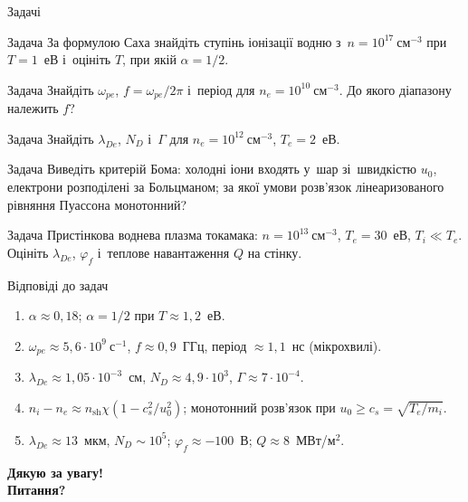 \documentclass[]{beamer}
\newcounter{probcnt}
\newcommand{\cm}{\mathrm{см}}
\begin{document}
\begin{frame}{Задачі}
	\begin{exampleblock}{\scriptsize Задача \theprobcnt}\justifying\scriptsize
		За формулою Саха знайдіть ступінь іонізації водню з~$n=10^{17}~\cm^{-3}$ при $T=1$~еВ і~оцініть $T$, при якій $\alpha=1/2$.
	\end{exampleblock}
	\begin{exampleblock}{\scriptsize Задача \theprobcnt}\justifying\scriptsize
		Знайдіть $\omega_{pe}$, $f=\omega_{pe}/2\pi$ і~період для $n_e=10^{10}~\cm^{-3}$. До якого діапазону належить $f$?
	\end{exampleblock}
	\begin{exampleblock}{\scriptsize Задача \theprobcnt}\justifying\scriptsize
		Знайдіть $\lambda_{De}$, $N_D$ і~$\Gamma$ для $n_e=10^{12}~\cm^{-3}$, $T_e=2$~еВ.
	\end{exampleblock}
	\begin{exampleblock}{\scriptsize Задача \theprobcnt}\justifying\scriptsize
		Виведіть критерій Бома: холодні іони входять у~шар зі~швидкістю $u_0$, електрони розподілені за Больцманом; за якої умови розв'язок
		лінеаризованого рівняння Пуассона монотонний?
	\end{exampleblock}
	\begin{exampleblock}{\scriptsize Задача \theprobcnt}\justifying\scriptsize
		Пристінкова воднева плазма токамака: $n=10^{13}~\cm^{-3}$, $T_e=30$~еВ, $T_i\ll T_e$. Оцініть $\lambda_{De}$, $\varphi_f$ і~теплове навантаження $Q$ на стінку.
	\end{exampleblock}
\end{frame}

\begin{frame}{Відповіді до задач}
	\begin{enumerate}\justifying\small
		\item $\alpha\approx0{,}18$; $\alpha=1/2$ при $T\approx1{,}2$~еВ.
		\item $\omega_{pe}\approx5{,}6\cdot10^9~\text{с}^{-1}$, $f\approx0{,}9$~ГГц, період $\approx1{,}1$~нс (мікрохвилі).
		\item $\lambda_{De}\approx1{,}05\cdot10^{-3}$~см, $N_D\approx4{,}9\cdot10^3$, $\Gamma\approx7\cdot10^{-4}$.
		\item $n_i-n_e\approx n_{\mathrm{sh}}\chi(1-c_s^2/u_0^2)$; монотонний розв'язок при $u_0\ge c_s=\sqrt{T_e/m_i}$.
		\item $\lambda_{De}\approx13$~мкм, $N_D\sim10^5$; $\varphi_f\approx-100$~В; $Q\approx8$~МВт/м$^2$.
	\end{enumerate}
\end{frame}

\begin{frame}
	\centering\bfseries\Huge Дякую за увагу!\\[1em]
	\normalsize\mdseries Питання?
\end{frame}
\end{document}
